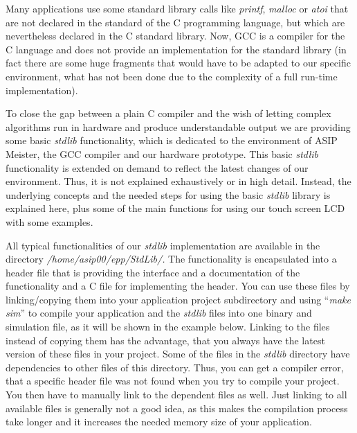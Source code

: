 Many applications use some standard library calls like \emph{printf},
\emph{malloc} or \emph{atoi} that are not declared in the standard of
the C programming language, but which are nevertheless declared in the C
standard library. Now, GCC is a compiler for the C language and does not
provide an implementation for the standard library (in fact there are
some huge fragments that would have to be adapted to our specific
environment, what has not been done due to the complexity of a full
run-time implementation).

To close the gap between a plain C compiler and the wish of letting
complex algorithms run in hardware and produce understandable output we
are providing some basic \emph{stdlib} functionality, which is dedicated
to the environment of ASIP Meister, the GCC compiler and our hardware
prototype. This basic \emph{stdlib} functionality is extended on demand
to reflect the latest changes of our environment. Thus, it is not
explained exhaustively or in high detail. Instead, the underlying
concepts and the needed steps for using the basic \emph{stdlib} library
is explained here, plus some of the main functions for using our touch
screen LCD with some examples.

All typical functionalities of our \emph{stdlib} implementation are
available in the directory \emph{/home/asip00/epp/StdLib/.} The
functionality is encapsulated into a header file that is providing the
interface and a documentation of the functionality and a C file for
implementing the header. You can use these files by linking/copying them
into your application project subdirectory and using ``\emph{make sim}''
to compile your application and the \emph{stdlib} files into one binary
and simulation file, as it will be shown in the example below. Linking
to the files instead of copying them has the advantage, that you always
have the latest version of these files in your project. Some of the
files in the \emph{stdlib} directory have dependencies to other files of
this directory. Thus, you can get a compiler error, that a specific
header file was not found when you try to compile your project. You then
have to manually link to the dependent files as well. Just linking to
all available files is generally not a good idea, as this makes the
compilation process take longer and it increases the needed memory size
of your application.

